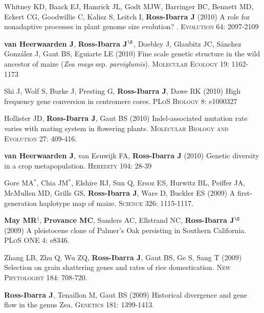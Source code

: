 \documentclass[letterpaper,10pt]{article}
\begin{document}
\begin{etaremune}
\item Whitney KD, Baack EJ, Hamrick JL, Godt MJW, Barringer BC, Bennett MD, Eckert CG, Goodwillie C, Kalisz S, Leitch I, {\bf Ross-Ibarra J} (2010) A role for nonadaptive processes in plant genome size evolution? . \textsc{Evolution} 64: 2097-2109


\item {\bf van Heerwaarden J}, {\bf Ross-Ibarra J}$^\S$, Doebley J, Glaubitz JC, S\'{a}nchez Gonz\'{a}lez J, Gaut BS, Eguiarte LE (2010) Fine scale genetic structure in the wild ancestor of maize (\emph{Zea mays} ssp. \emph{parviglumis}).  \textsc{Molecular Ecology} 19: 1162-1173


\item Shi J, Wolf S, Burke J, Presting G, {\bf Ross-Ibarra J}, Dawe RK (2010) High frequency gene conversion in centromere cores.  \textsc{PLoS Biology} 8: e1000327


\item Hollister JD, {\bf Ross-Ibarra J}, Gaut BS (2010) Indel-associated mutation rate varies with mating system in flowering plants.  \textsc{Molecular Biology and Evolution} 27: 409-416.

\item {\bf van Heerwaarden J}, van Eeuwijk FA, {\bf Ross-Ibarra J} (2010) Genetic diversity in a crop metapopulation.  \textsc{Heredity} 104: 28-39


\item Gore MA$^*$, Chia JM$^*$, Elshire RJ, Sun Q, Ersoz ES, Hurwitz BL, Peiffer JA, McMullen MD, Grills GS, {\bf Ross-Ibarra J}, Ware D, Buckler ES (2009) A first-generation haplotype map of maize.  \textsc{Science 326}: 1115-1117.


\item {\bf May MR}$^\ddagger$, {\bf Provance MC}, Sanders AC, Ellstrand NC, {\bf Ross-Ibarra J}$^\S$ (2009) A pleistocene clone of Palmer's Oak persisting in Southern California.  \textsc{PLoS ONE} 4: e8346.


\item Zhang LB, Zhu Q, Wu ZQ, {\bf Ross-Ibarra J}, Gaut BS, Ge S, Sang T (2009) Selection on grain shattering genes and rates of rice domestication.  \textsc{New Phytologist} 184: 708-720.

\item {\bf Ross-Ibarra J}, Tenaillon M, Gaut BS (2009) Historical divergence and gene flow in the genus Zea.  \textsc{Genetics} 181: 1399-1413.



\end{etaremune}
\end{document}
